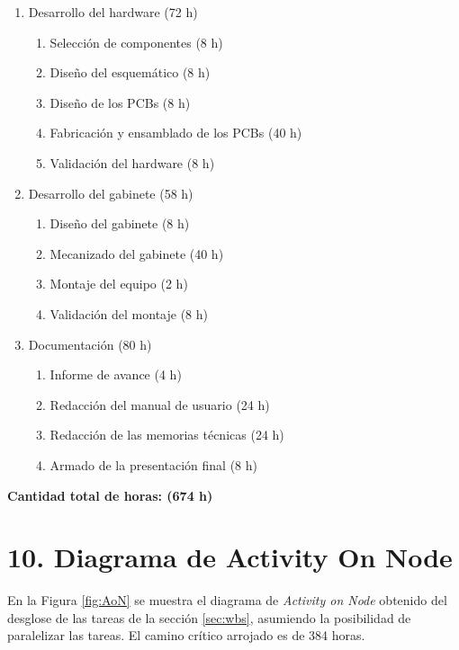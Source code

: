 \documentclass[
11pt, %
]{charter}
\begin{document}
\begin{enumerate}
	\item Desarrollo del hardware (72 h)
	\begin{enumerate}
		\item Selección de componentes (8 h)
		\item Diseño del esquemático (8 h)
		\item Diseño de los PCBs (8 h)
		\item Fabricación y ensamblado de los PCBs (40 h)
		\item Validación del hardware (8 h)
	\end{enumerate}

	\item Desarrollo del gabinete (58 h)
	\begin{enumerate}
		\item Diseño del gabinete (8 h)
		\item Mecanizado del gabinete (40 h)
		\item Montaje del equipo (2 h)
		\item Validación del montaje (8 h)
	\end{enumerate}
	
	\item Documentación (80 h)
	\begin{enumerate}
		\item Informe de avance (4 h)
		\item Redacción del manual de usuario (24 h)
		\item Redacción de las memorias técnicas (24 h)
		\item Armado de la presentación final (8 h)
	\end{enumerate}
\end{enumerate}

\textbf{Cantidad total de horas: (674 h)}

\newpage

\section{10. Diagrama de Activity On Node}
\label{sec:AoN}

En la Figura \ref{fig:AoN} se muestra el diagrama de \emph{Activity on Node} obtenido del desglose de las tareas de la sección \ref{sec:wbs}, asumiendo la posibilidad de paralelizar las tareas. El camino crítico arrojado es de 384 horas.
\end{document}
